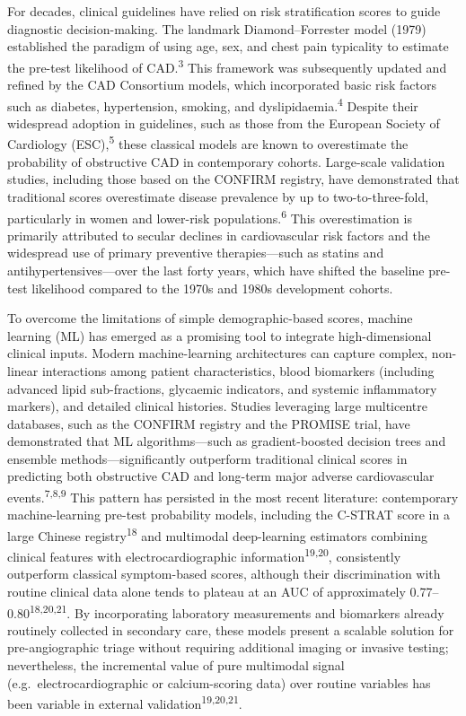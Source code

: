 \documentclass[
  english,
  11pt,
]{article}
\begin{document}
For decades, clinical guidelines have relied on risk stratification scores to guide diagnostic decision-making. The landmark Diamond--Forrester model (1979) established the paradigm of using age, sex, and chest pain typicality to estimate the pre-test likelihood of CAD.\textsuperscript{3} This framework was subsequently updated and refined by the CAD Consortium models, which incorporated basic risk factors such as diabetes, hypertension, smoking, and dyslipidaemia.\textsuperscript{4} Despite their widespread adoption in guidelines, such as those from the European Society of Cardiology (ESC),\textsuperscript{5} these classical models are known to overestimate the probability of obstructive CAD in contemporary cohorts. Large-scale validation studies, including those based on the CONFIRM registry, have demonstrated that traditional scores overestimate disease prevalence by up to two-to-three-fold, particularly in women and lower-risk populations.\textsuperscript{6} This overestimation is primarily attributed to secular declines in cardiovascular risk factors and the widespread use of primary preventive therapies---such as statins and antihypertensives---over the last forty years, which have shifted the baseline pre-test likelihood compared to the 1970s and 1980s development cohorts.

To overcome the limitations of simple demographic-based scores, machine learning (ML) has emerged as a promising tool to integrate high-dimensional clinical inputs. Modern machine-learning architectures can capture complex, non-linear interactions among patient characteristics, blood biomarkers (including advanced lipid sub-fractions, glycaemic indicators, and systemic inflammatory markers), and detailed clinical histories. Studies leveraging large multicentre databases, such as the CONFIRM registry and the PROMISE trial, have demonstrated that ML algorithms---such as gradient-boosted decision trees and ensemble methods---significantly outperform traditional clinical scores in predicting both obstructive CAD and long-term major adverse cardiovascular events.\textsuperscript{7,8,9} This pattern has persisted in the most recent literature: contemporary machine-learning pre-test probability models, including the C-STRAT score in a large Chinese registry\textsuperscript{18} and multimodal deep-learning estimators combining clinical features with electrocardiographic information\textsuperscript{19,20}, consistently outperform classical symptom-based scores, although their discrimination with routine clinical data alone tends to plateau at an AUC of approximately 0.77--0.80\textsuperscript{18,20,21}. By incorporating laboratory measurements and biomarkers already routinely collected in secondary care, these models present a scalable solution for pre-angiographic triage without requiring additional imaging or invasive testing; nevertheless, the incremental value of pure multimodal signal (e.g.\ electrocardiographic or calcium-scoring data) over routine variables has been variable in external validation\textsuperscript{19,20,21}.
\end{document}
